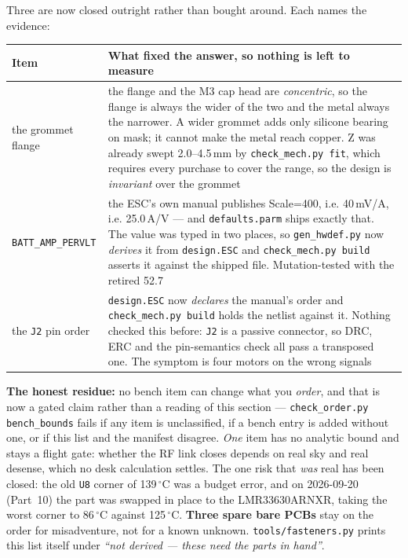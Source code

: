 \documentclass[11pt,a4paper]{article}
\newcommand{\file}[1]{\texttt{\small #1}}
\newcommand{\flag}[1]{\textcolor{warnred}{\textbf{#1}}}
\newcommand{\degC}{$^\circ$C}
\begin{document}
Three are now closed outright rather than bought around. Each names the evidence:

\begin{center}
\begin{tabular}{@{}P{0.26\textwidth}P{0.62\textwidth}@{}}
\toprule
\textbf{Item} & \textbf{What fixed the answer, so nothing is left to measure} \\
\midrule
the grommet flange & the flange and the M3 cap head are \emph{concentric}, so the flange is
always the wider of the two and the metal always the narrower. A wider grommet adds only
silicone bearing on mask; it cannot make the metal reach copper. Z was already swept
2.0--4.5\,mm by \file{check\_mech.py fit}, which requires every purchase to cover the range, so
the design is \emph{invariant} over the grommet \\
\file{BATT\_AMP\_PERVLT} & the ESC's own manual publishes Scale=400, i.e. 40\,mV/A, i.e.
25.0\,A/V --- and \file{defaults.parm} ships exactly that. The value was typed in two places,
so \file{gen\_hwdef.py} now \emph{derives} it from \file{design.ESC} and \file{check\_mech.py build}
asserts it against the shipped file. Mutation-tested with the retired 52.7 \\
the \file{J2} pin order & \file{design.ESC} now \emph{declares} the manual's order and
\file{check\_mech.py build} holds the netlist against it. Nothing checked this before: \file{J2} is
a passive connector, so DRC, ERC and the pin-semantics check all pass a transposed one. The
symptom is four motors on the wrong signals \\
\bottomrule
\end{tabular}
\end{center}

\flag{The honest residue:} no bench item can change what you \emph{order}, and that is now a
gated claim rather than a reading of this section --- \file{check\_order.py bench\_bounds} fails if
any item is unclassified, if a bench entry is added without one, or if this list and the
manifest disagree. \emph{One} item has no analytic bound and stays a flight gate: whether the
RF link closes depends on real sky and real desense, which no desk calculation settles. The one risk that \emph{was}
real has been closed: the old \file{U8} corner of 139\,\degC{} was a budget error, and on
2026-09-20 (Part~10) the part was swapped in place to the LMR33630ARNXR, taking the worst
corner to 86\,\degC{} against 125\,\degC{}. \textbf{Three spare bare PCBs} stay on the order
for misadventure, not for a known unknown. \file{tools/fasteners.py} prints this list itself under
\emph{``not derived --- these need the parts in hand''}.
\end{document}

